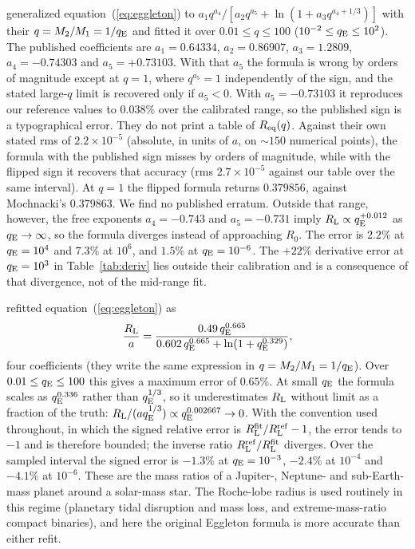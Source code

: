\documentclass[twocolumn]{aastex702}
\newcommand{\qE}{q_{\rm E}}
\newcommand{\RL}{R_{\rm L}}
\begin{document}
\citet{LeahyLeahy2015} generalized equation~(\ref{eq:eggleton}) to $a_1q^{a_4}/[a_2q^{a_5}+\ln(1+a_3q^{a_4+1/3})]$ with their $q=M_2/M_1=1/\qE$ and fitted it over $0.01\le q\le100$ ($10^{-2}\le\qE\le10^{2}$). The published coefficients are $a_1=0.64334$, $a_2=0.86907$, $a_3=1.2809$, $a_4=-0.74303$ and $a_5=+0.73103$. With that $a_5$ the formula is wrong by orders of magnitude except at $q=1$, where $q^{a_5}=1$ independently of the sign, and the stated large-$q$ limit is recovered only if $a_5<0$. With $a_5=-0.73103$ it reproduces our reference values to $0.038\%$ over the calibrated range, so the published sign is a typographical error. They do not print a table of $R_{\rm eq}(q)$. Against their own stated rms of $2.2\times10^{-5}$ (absolute, in units of $a$, on $\sim150$ numerical points), the formula with the published sign misses by orders of magnitude, while with the flipped sign it recovers that accuracy (rms $2.7\times10^{-5}$ against our table over the same interval). At $q=1$ the flipped formula returns $0.379856$, against Mochnacki's $0.379863$. We find no published erratum. Outside that range, however, the free exponents $a_4=-0.743$ and $a_5=-0.731$ imply $\RL\propto\qE^{+0.012}$ as $\qE\to\infty$, so the formula diverges instead of approaching $R_0$. The error is $2.2\%$ at $\qE=10^4$ and $7.3\%$ at $10^6$, and $1.5\%$ at $\qE=10^{-6}$. The $+22\%$ derivative error at $\qE=10^3$ in Table~\ref{tab:deriv} lies outside their calibration and is a consequence of that divergence, not of the mid-range fit.

\citet{Qi2026} refitted equation~(\ref{eq:eggleton}) as
\begin{equation}
\frac{\RL}{a}=\frac{0.49\,\qE^{0.665}}{0.602\,\qE^{0.665}+\ln\!\left(1+\qE^{0.329}\right)},
\label{eq:qi}
\end{equation}
four coefficients (they write the same expression in $q=M_2/M_1=1/\qE$). Over $0.01\le\qE\le100$ this gives a maximum error of $0.65\%$. At small $\qE$ the formula scales as $\qE^{0.336}$ rather than $\qE^{1/3}$, so it underestimates $\RL$ without limit as a fraction of the truth: $\RL/(a\qE^{1/3})\propto\qE^{0.002667}\to0$. With the convention used throughout, in which the signed relative error is $\RL^{\rm fit}/\RL^{\rm ref}-1$, the error tends to $-1$ and is therefore bounded; the inverse ratio $\RL^{\rm ref}/\RL^{\rm fit}$ diverges. Over the sampled interval the signed error is $-1.3\%$ at $\qE=10^{-3}$, $-2.4\%$ at $10^{-4}$ and $-4.1\%$ at $10^{-6}$. These are the mass ratios of a Jupiter-, Neptune- and sub-Earth-mass planet around a solar-mass star. The Roche-lobe radius is used routinely in this regime (planetary tidal disruption and mass loss, and extreme-mass-ratio compact binaries), and here the original Eggleton formula is more accurate than either refit.
\end{document}
